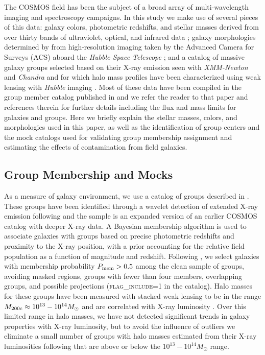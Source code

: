 \documentclass[12pt]{emulateapj}
\begin{document}
The COSMOS field \citep{Scoville2007a} has been the subject of a broad
array of multi-wavelength imaging and spectroscopy campaigns. In this
study we make use of several pieces of this data: galaxy colors, photometric redshifts, and stellar
masses derived from over thirty bands of ultraviolet, optical, and
infrared data \citep{Ilbert2009, Ilbert2010, Bundy2010}; galaxy
morphologies determined by \citet{Scarlata2007} from high-resolution imaging taken by the
Advanced Camera for Surveys (ACS) aboard the \textit{Hubble Space
  Telescope} \citep{Koekemoer2007}; and a catalog of massive galaxy
groups selected based on their X-ray emission seen with
\textit{XMM-Newton} and \textit{Chandra} and for which halo mass
profiles have been characterized using weak lensing with
\textit{Hubble} imaging \citep{Leauthaud2010, George2011,
  George2012}. Most of these data have been compiled in the group
member catalog published in \citet{George2011} and we refer the reader
to that paper and references therein for further details including the
flux and mass limits for galaxies and groups. Here we briefly explain
the stellar masses, colors, and morphologies used in this paper, as
well as the identification of group centers and the mock catalogs used
for validating group membership assignment and estimating the effects
of contamination from field galaxies.

\subsection{Group Membership and Mocks}
\label{s:groupdata}

As a measure of galaxy environment, we use a catalog of groups
described in \citet{George2011}. These groups have been identified
through a wavelet detection of extended X-ray emission following
\citet{Finoguenov2010} and the sample is an expanded version of an
earlier COSMOS catalog \citep{Finoguenov2007} with deeper X-ray data.
A Bayesian membership algorithm is used to associate galaxies with
groups based on precise photometric redshifts and proximity to the
X-ray position, with a prior accounting for the relative field
population as a function of magnitude and redshift. Following
\citet{George2011}, we select galaxies with membership probability
$P_{\rm mem}>0.5$ among the clean sample of groups, avoiding masked
regions, groups with fewer than four members, overlapping groups, and
possible projections (\textsc{flag\_include}=1 in the catalog). Halo
masses for these groups have been measured with stacked weak lensing
to be in the range $M_{\rm 200c} \approx 10^{13} - 10^{14} M_{\odot}$
and are correlated with X-ray luminosity \citep{Leauthaud2010,
  George2012}. Over this limited range in halo masses, we have not
detected significant trends in galaxy properties with X-ray
luminosity, but to avoid the influence of outliers we eliminate a
small number of groups with halo masses estimated from
  their X-ray luminosities following \citet{Leauthaud2010} that are
above or below the $10^{13}-10^{14} M_{\odot}$ range.
\end{document}
